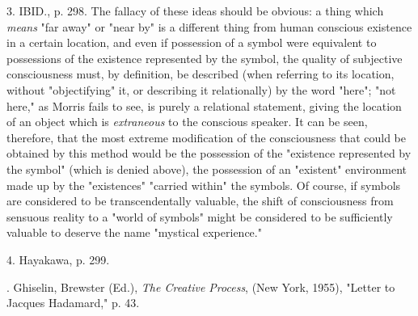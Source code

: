 3. IBID., p. 298. The fallacy of these ideas should be obvious:
a thing which \textit{means} "far away" or "near by" is a different thing
from human conscious existence in a certain location, and even if possession
of a symbol were equivalent to possessions of the existence represented by the symbol, the
quality of subjective consciousness must, by definition, be
described (when referring to its location, without "objectifying" it,
or describing it relationally) by the word "here";
"not here," as Morris fails to see, is purely a relational statement,
giving the location of an object which is \textit{extraneous} to the conscious speaker. It
can be seen, therefore, that the most extreme modification of the consciousness that
could be obtained by this method would be the possession of the "existence represented by the symbol"
(which is denied above), the possession of an "existent" environment made up by the
"existences" "carried within" the symbols. Of course, if symbols are considered
to be transcendentally valuable, the shift of consciousness from sensuous reality
to a "world of symbols" might be considered to be sufficiently valuable to deserve the name "mystical experience."\par
4. Hayakawa, p. 299.\par
[5, 6]. Ghiselin, Brewster (Ed.), \textit{The Creative Process}, (New York, 1955), "Letter to Jacques Hadamard," p. 43.\par

\newpage

{}

